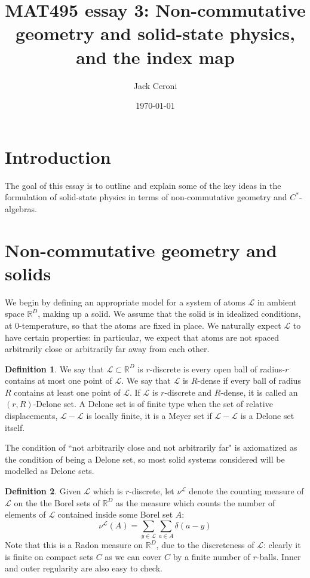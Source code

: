 \documentclass[aps,pra,showpacs,notitlepage,onecolumn,superscriptaddress,nofootinbib]{revtex4-1}
\theoremstyle{definition}
\newtheorem{definition}{Definition}[section]
\begin{document}
\title{MAT495 essay 3: Non-commutative geometry and solid-state physics, and the index map}
\date{\today}
\author{Jack Ceroni}
\maketitle

\section{Introduction}

\noindent The goal of this essay is to outline and explain some of the key ideas in the formulation of solid-state physics in terms of non-commutative geometry and $C^{*}$-algebras.

\section{Non-commutative geometry and solids}

\noindent We begin by defining an appropriate model for a system of atoms $\mathcal{L}$ in ambient space $\mathbb{R}^{D}$, making up a solid. We assume that the solid is in idealized conditions, at $0$-temperature, so that the atoms are fixed in place. We naturally expect $\mathcal{L}$ to have certain properties: in particular, we expect that atoms are not spaced arbitrarily close or arbitrarily far away from each other.

\begin{definition}
   We say that $\mathcal{L} \subset \mathbb{R}^{D}$ is $r$-discrete is every open ball of radius-$r$ contains at most one point of $\mathcal{L}$. We say that $\mathcal{L}$ is $R$-dense if every ball of radius $R$ contains at least one point of $\mathcal{L}$. If $\mathcal{L}$ is $r$-discrete and $R$-dense, it is called an $(r, R)$-Delone set. A Delone set is of finite type when the set of relative displacements, $\mathcal{L} - \mathcal{L}$ is locally finite, it is a Meyer set if $\mathcal{L} - \mathcal{L}$ is a Delone set itself.
\end{definition}

\noindent The condition of ``not arbitrarily close and not arbitrarily far" is axiomatized as the condition of being a Delone set, so most solid systems considered will be modelled as Delone sets.

\begin{definition}
    Given $\mathcal{L}$ which is $r$-discrete, let $\nu^{\mathcal{L}}$ denote the counting measure of $\mathcal{L}$ on the the Borel sets of $\mathbb{R}^{D}$ as the measure which counts the number of elements of $\mathcal{L}$ contained inside some Borel set $A$:
    \begin{equation}
        \nu^{\mathcal{L}}(A) = \displaystyle\sum_{y \in \mathcal{L}} \displaystyle\sum_{a \in A} \delta(a - y)
    \end{equation}
    Note that this is a Radon measure on $\mathbb{R}^{D}$, due to the discreteness of $\mathcal{L}$: clearly it is finite on compact sets $C$ as we can cover $C$ by a finite number of $r$-balls. Inner and outer regularity are also easy to check.
\end{definition}
\end{document}
